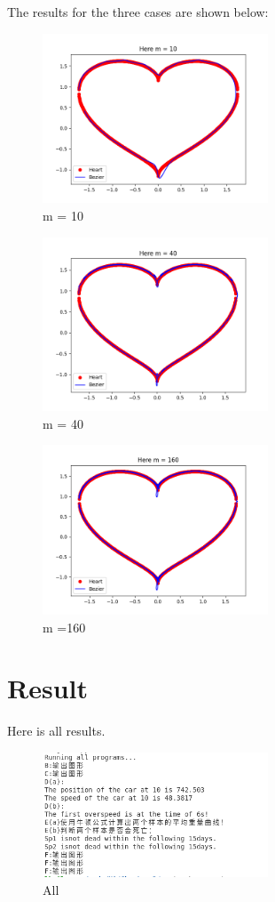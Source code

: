 \documentclass[a4paper]{article}
\begin{document}
 The results for the three cases are shown below:
 \begin{figure}[htbp]
  \centering
  \includegraphics[width=0.6\textwidth]{pic/F1.png}
  \caption{m = 10}
\end{figure}
\begin{figure}[htbp]
  \centering
  \includegraphics[width=0.6\textwidth]{pic/F2.png}
  \caption{m = 40}
\end{figure}
\begin{figure}[htbp]
  \centering
  \includegraphics[width=0.6\textwidth]{pic/F3.png}
  \caption{m =160}
\end{figure}

\section*{Result}
Here is all results.
\begin{figure}[htbp]
  \centering
  \includegraphics[width=0.6\textwidth]{pic/result.png}
  \caption{All}
\end{figure}
\end{document}
